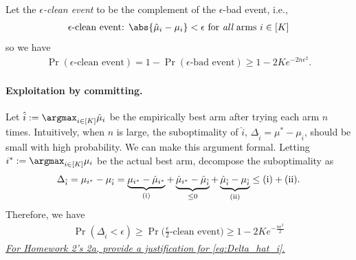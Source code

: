 Let the {\em $\epsilon$-clean event} to be the complement of the $\epsilon$-bad event, i.e.,
\begin{align*}
\text{
$\epsilon$-clean event: $\abs{\hat{\mu}_i-\mu_i} < \epsilon$ for {\em all} arms $i\in[K]$
}
\end{align*}
so we have 
\begin{align}
\label{eq:clean event}
    \Pr(\text{$\epsilon$-clean event})  = 1-\Pr(\text{$\epsilon$-bad event}) \geq 1- 2K e^{-2 n \epsilon^2}.
\end{align}


\paragraph{Exploitation by committing.}
Let $\hat{i}:=\argmax_{i\in[K]} \hat{\mu}_{i}$ be the empirically best arm after trying each arm $n$ times.
Intuitively, when $n$ is large, the suboptimality of $\hat{i}$, $\Delta_{\hat{i}}=\mu^* - \mu_{\hat{i}}$, should be small with high probability.
We can make this argument formal.
Letting $i^*:=\argmax_{i\in[K]} {\mu}_{i}$ be the actual best arm, decompose the suboptimality as 
\begin{align*}
    \Delta_{\hat{i}} = 
\mu_{i^*}-\mu_{\hat{i}} =\underbrace{\mu_{i^*}-\hat{\mu}_{i^*}}_{{\rm (i)}}+\underbrace{\hat{\mu}_{i^*}-\hat{\mu}_{\hat{i}}}_{\leq 0}+\underbrace{\hat{\mu}_{\hat{i}}-\mu_{\hat{i}}}_{\rm (ii)}
\leq {\rm (i)}+{\rm (ii)}
.
\end{align*}
Therefore, we have
\begin{align}
\label{eq:Delta_hat_i}
    \Pr(\Delta_{\hat{i}}<\epsilon) \geq \Pr\big(\text{$\tfrac{\epsilon}{2}$-clean event}\big) \geq 1 - 2K e^{-\frac{n \epsilon^2}{2}}
\end{align}
\underline{\em For Homework 2's 2a, provide a justification for \eqref{eq:Delta_hat_i}.}


